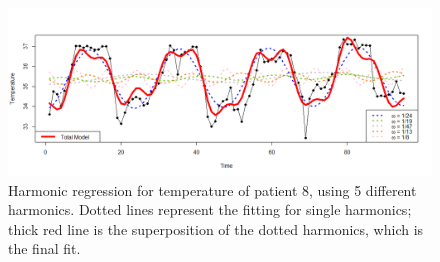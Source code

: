 \documentclass[]{article}
\begin{document}
\begin{figure}[htbp]\centering
	\includegraphics[scale = 0.37]{fitted_temp8.png}
	\caption{Harmonic regression for temperature of patient 8, using 5 different harmonics. Dotted lines represent the fitting for single harmonics; thick red line is the superposition of the dotted harmonics, which is the final fit.}
	\label{fig:fitted.Temp8}
\end{figure}
\end{document}
